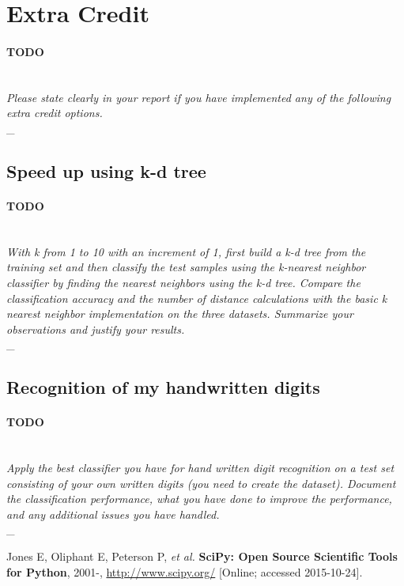 \documentclass{article}
\newcommand{\outline}[2]{\paragraph{\textsc{#1}}\hrulefill~\\{\small\it #2}\\\_\hrulefill~\\}
\newcommand{\todo}[1]{\outline{\large TODO}{#1}}
\begin{document}

\section{Extra Credit}
\todo{Please state clearly in your report if you have implemented any of the following extra
credit options.}

\subsection{Speed up using k-d tree}
\todo{With k from 1 to 10 with an increment of 1, first build a k-d tree from the training set and then classify the test samples using the k-nearest neighbor classifier by finding the nearest neighbors using the k-d tree. Compare the classification accuracy and the number of distance calculations with the basic k nearest neighbor implementation on the three datasets. Summarize your observations and justify your results.}

\subsection{Recognition of my handwritten digits}
\todo{Apply the best classifier you have for hand written digit recognition on a test set consisting of your own written digits (you need to create the dataset). Document the classification performance, what you have done to improve the performance, and any additional issues you have handled.}


\begin{thebibliography}{9}

    Jones E, Oliphant E, Peterson P, \emph{et al.}
    {\bf SciPy: Open Source Scientific Tools for Python}, 2001-,
    \url{http://www.scipy.org/} [Online; accessed 2015-10-24].

\end{thebibliography}

\end{document}
